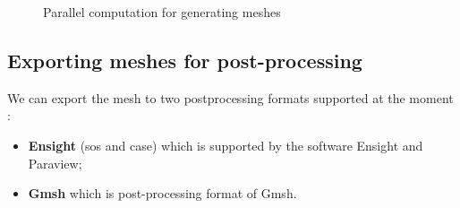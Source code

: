 \newline
 \begin{figure}[!h]
  \centering
  \caption{Parallel computation for generating meshes}

\end{figure}
  \label{fig:2}



\subsection{Exporting meshes for post-processing}

We can export the mesh to two postprocessing formats supported at the moment :
\begin{itemize}
\item \textbf{Ensight} (sos and case)  which is supported by the software Ensight and Paraview;
\item \textbf{Gmsh} which is post-processing format of Gmsh.
\end{itemize}

